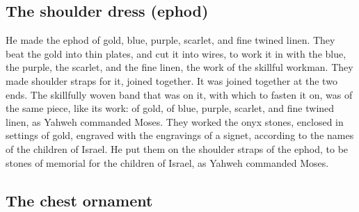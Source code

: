 \begin{paracol}{2}
\begin{otherlanguage}{english}
{\subsection{The shoulder dress
(ephod)}\label{the-shoulder-dress-ephod-1}}

 He made the ephod of gold, blue, purple, scarlet, and
fine twined linen.  They beat the gold into thin plates,
and cut it into wires, to work it in with the blue, the purple, the
scarlet, and the fine linen, the work of the skillful workman.
 They made shoulder straps for it, joined together. It was
joined together at the two ends.  The skillfully woven
band that was on it, with which to fasten it on, was of the same piece,
like its work: of gold, of blue, purple, scarlet, and fine twined linen,
as Yahweh commanded Moses.  They worked the onyx stones,
enclosed in settings of gold, engraved with the engravings of a signet,
according to the names of the children of Israel.  He put
them on the shoulder straps of the ephod, to be stones of memorial for
the children of Israel, as Yahweh commanded Moses.

\hypertarget{the-chest-ornament}{%
\subsection{The chest ornament}\label{the-chest-ornament}}


\end{otherlanguage}
\end{paracol}
